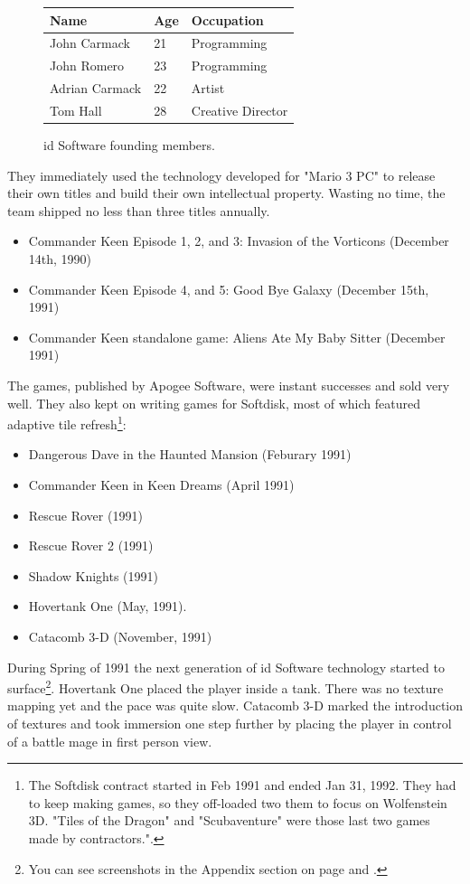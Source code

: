 \documentclass[book.tex]{subfiles}
\begin{document}
 \begin{figure}[H]
\centering  
\begin{tabularx}{\textwidth}{ X  X  X  }
  \toprule
  \textbf{Name} &  \textbf{Age} & \textbf{Occupation} \\
  \toprule 
   John Carmack & 21 &  Programming\\
   John Romero & 23 &  Programming\\
   Adrian Carmack & 22 &  Artist\\
   Tom Hall & 28 &  Creative Director\\
     \toprule
\end{tabularx}
\caption{id Software founding members.}\label{fig:Id Software team}
\end{figure}
\pagebreak
They immediately used the technology developed for "Mario 3 PC" to release their own titles and build their own intellectual property. Wasting no time, the team shipped no less than three titles annually.
\begin{itemize}
    \item Commander Keen Episode 1, 2, and 3: Invasion of the Vorticons (December 14th, 1990)
    \item Commander Keen Episode 4, and 5: Good Bye Galaxy (December 15th, 1991)
    \item Commander Keen standalone game: Aliens Ate My Baby Sitter (December 1991)
\end{itemize}
The games, published by Apogee Software, were instant successes and sold very well. They also kept on writing games for Softdisk, most of which featured adaptive tile refresh\footnote{The Softdisk contract started in Feb 1991 and ended Jan 31, 1992. They had to keep making games, so they off-loaded two them to focus on Wolfenstein 3D. "Tiles of the Dragon" and "Scubaventure" were those last two games made by contractors.".}:
\begin{itemize}
  \item Dangerous Dave in the Haunted Mansion (Feburary 1991)
  \item Commander Keen in Keen Dreams (April 1991)
  \item Rescue Rover (1991)
  \item Rescue Rover 2 (1991)
  \item Shadow Knights (1991)
  \item Hovertank One (May, 1991).
  \item Catacomb 3-D (November, 1991)
\end{itemize}
During Spring of 1991 the next generation of id Software technology started to surface\footnote{You can see screenshots in the Appendix section on page \pageref{hovertank3d_screenshot} and \pageref{catacomb3d_screenshot}.}. Hovertank One placed the player inside a tank. There was no texture mapping yet and the pace was quite slow. Catacomb 3-D marked the introduction of textures and took immersion one step further by placing the player in control of a battle mage in first person view. \\
\end{document}
